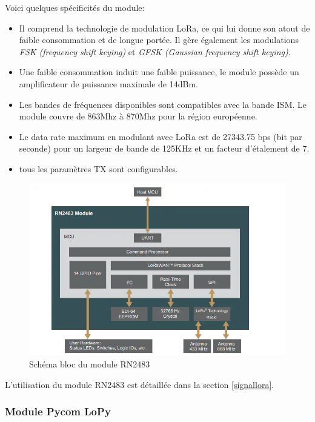 Voici quelques spécificités du module:
\vspace{0.1cm}

\begin{itemize}
\item Il comprend la technologie de modulation LoRa, ce qui lui donne son atout de faible consommation et de longue portée. Il gère également les modulations \textit{FSK (frequency shift keying)} et \textit{GFSK (Gaussian frequency shift keying)}.
\item Une faible consommation induit une faible puissance, le module possède un amplificateur de puissance maximale de 14dBm.
\item Les bandes de fréquences disponibles sont compatibles avec la bande ISM. Le module couvre de 863Mhz à 870Mhz pour la région européenne.
\item Le data rate maximum en modulant avec LoRa est de 27343.75 bps (bit par seconde) pour un largeur de bande de 125KHz et un facteur d'étalement de 7.
\item tous les paramètres TX sont configurables.
\end{itemize}


\begin{figure}[h]
\centering

\includegraphics[scale=0.8]{images/SBrn2483.png}
\caption{Schéma bloc du module RN2483}\label{term3002}
\end{figure}

L'utilisation du module RN2483 est détaillée dans la section \ref{signallora}.

\subsubsection{Module Pycom LoPy}



